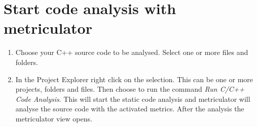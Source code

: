 \documentclass[11pt,a4paper,oneside]{scrreprt}
\begin{document}
\section{Start code analysis with metriculator}
\begin{enumerate}
\item Choose your C++ source code to be analysed. Select one or more files and folders.
\item In the Project Explorer right click on the selection. This can be one or more projects, folders and files. Then choose to run the command \textit{Run C/C++ Code Analysis}. This will start the static code analysis and metriculator will analyse the source code with the activated metrics. After the analysis the metriculator view opens.
\end{enumerate}
\end{document}
